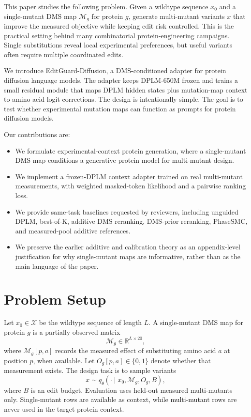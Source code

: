 \documentclass{article}
\newcommand{\X}{\mathcal{X}}
\newcommand{\M}{\mathcal{M}}
\newcommand{\1}{\mathbf{1}}
\begin{document}
This paper studies the following problem. Given a wildtype sequence $x_0$ and a single-mutant DMS map $\M_g$ for protein $g$, generate multi-mutant variants $x$ that improve the measured objective while keeping edit risk controlled. This is the practical setting behind many combinatorial protein-engineering campaigns. Single substitutions reveal local experimental preferences, but useful variants often require multiple coordinated edits.

We introduce EditGuard-Diffusion, a DMS-conditioned adapter for protein diffusion language models. The adapter keeps DPLM-650M frozen and trains a small residual module that maps DPLM hidden states plus mutation-map context to amino-acid logit corrections. The design is intentionally simple. The goal is to test whether experimental mutation maps can function as prompts for protein diffusion models.

Our contributions are:
\begin{itemize}
  \item We formulate experimental-context protein generation, where a single-mutant DMS map conditions a generative protein model for multi-mutant design.
  \item We implement a frozen-DPLM context adapter trained on real multi-mutant measurements, with weighted masked-token likelihood and a pairwise ranking loss.
  \item We provide same-task baselines requested by reviewers, including unguided DPLM, best-of-K, additive DMS reranking, DMS-prior reranking, PhaseSMC, and measured-pool additive references.
  \item We preserve the earlier additive and calibration theory as an appendix-level justification for why single-mutant maps are informative, rather than as the main language of the paper.
\end{itemize}

\section{Problem Setup}

Let $x_0 \in \X$ be the wildtype sequence of length $L$. A single-mutant DMS map for protein $g$ is a partially observed matrix
\begin{equation}
  \M_g \in \mathbb{R}^{L \times 20},
\end{equation}
where $\M_g[p,a]$ records the measured effect of substituting amino acid $a$ at position $p$, when available. Let $O_g[p,a] \in \{0,1\}$ denote whether that measurement exists. The design task is to sample variants
\begin{equation}
  x \sim q_\theta(\cdot \mid x_0, \M_g, O_g, B),
\end{equation}
where $B$ is an edit budget. Evaluation uses held-out measured multi-mutants only. Single-mutant rows are available as context, while multi-mutant rows are never used in the target protein context.
\end{document}
